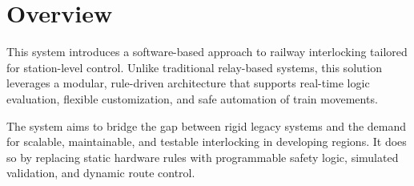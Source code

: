 \section{Overview}
\label{sec:system-overview:overview}

This system introduces a software-based approach to railway interlocking tailored for station-level control. Unlike traditional relay-based systems, this solution leverages a modular, rule-driven architecture that supports real-time logic evaluation, flexible customization, and safe automation of train movements.

The system aims to bridge the gap between rigid legacy systems and the demand for scalable, maintainable, and testable interlocking in developing regions. It does so by replacing static hardware rules with programmable safety logic, simulated validation, and dynamic route control.
